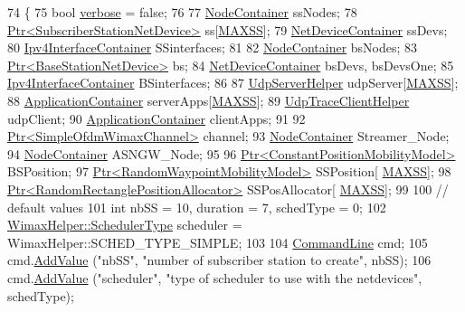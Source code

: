 \begin{DoxyCode}
74 \{
75   \textcolor{keywordtype}{bool} \hyperlink{openflow-switch_8cc_ab3f078684998b83967d507d0f453f454}{verbose} = \textcolor{keyword}{false};
76 
77   \hyperlink{classns3_1_1NodeContainer}{NodeContainer} ssNodes;
78   \hyperlink{classns3_1_1Ptr}{Ptr<SubscriberStationNetDevice>} ss[\hyperlink{wimax-multicast_8cc_a70d6b107a3aed69eb4a4b5d94cfc81cb}{MAXSS}];
79   \hyperlink{classns3_1_1NetDeviceContainer}{NetDeviceContainer} ssDevs;
80   \hyperlink{classns3_1_1Ipv4InterfaceContainer}{Ipv4InterfaceContainer} SSinterfaces;
81 
82   \hyperlink{classns3_1_1NodeContainer}{NodeContainer} bsNodes;
83   \hyperlink{classns3_1_1Ptr}{Ptr<BaseStationNetDevice>} bs;
84   \hyperlink{classns3_1_1NetDeviceContainer}{NetDeviceContainer} bsDevs, bsDevsOne;
85   \hyperlink{classns3_1_1Ipv4InterfaceContainer}{Ipv4InterfaceContainer} BSinterfaces;
86 
87   \hyperlink{classns3_1_1UdpServerHelper}{UdpServerHelper} udpServer[\hyperlink{wimax-multicast_8cc_a70d6b107a3aed69eb4a4b5d94cfc81cb}{MAXSS}];
88   \hyperlink{classns3_1_1ApplicationContainer}{ApplicationContainer} serverApps[\hyperlink{wimax-multicast_8cc_a70d6b107a3aed69eb4a4b5d94cfc81cb}{MAXSS}];
89   \hyperlink{classns3_1_1UdpTraceClientHelper}{UdpTraceClientHelper} udpClient;
90   \hyperlink{classns3_1_1ApplicationContainer}{ApplicationContainer} clientApps;
91 
92   \hyperlink{classns3_1_1Ptr}{Ptr<SimpleOfdmWimaxChannel>} channel;
93   \hyperlink{classns3_1_1NodeContainer}{NodeContainer} Streamer\_Node;
94   \hyperlink{classns3_1_1NodeContainer}{NodeContainer} ASNGW\_Node;
95 
96   \hyperlink{classns3_1_1Ptr}{Ptr<ConstantPositionMobilityModel>} BSPosition;
97   \hyperlink{classns3_1_1Ptr}{Ptr<RandomWaypointMobilityModel>} SSPosition[
      \hyperlink{wimax-multicast_8cc_a70d6b107a3aed69eb4a4b5d94cfc81cb}{MAXSS}];
98   \hyperlink{classns3_1_1Ptr}{Ptr<RandomRectanglePositionAllocator>} SSPosAllocator[
      \hyperlink{wimax-multicast_8cc_a70d6b107a3aed69eb4a4b5d94cfc81cb}{MAXSS}];
99 
100   \textcolor{comment}{// default values}
101   \textcolor{keywordtype}{int} nbSS = 10, duration = 7, schedType = 0;
102   \hyperlink{classns3_1_1WimaxHelper_a27a40a8f601900126156781c2ca79406}{WimaxHelper::SchedulerType} scheduler = WimaxHelper::SCHED\_TYPE\_SIMPLE;
103 
104   \hyperlink{classns3_1_1CommandLine}{CommandLine} cmd;
105   cmd.\hyperlink{classns3_1_1CommandLine_addcfb546c7ad4c8bd0965654d55beb8e}{AddValue} (\textcolor{stringliteral}{"nbSS"}, \textcolor{stringliteral}{"number of subscriber station to create"}, nbSS);
106   cmd.\hyperlink{classns3_1_1CommandLine_addcfb546c7ad4c8bd0965654d55beb8e}{AddValue} (\textcolor{stringliteral}{"scheduler"}, \textcolor{stringliteral}{"type of scheduler to use with the netdevices"}, schedType);

\end{DoxyCode}
